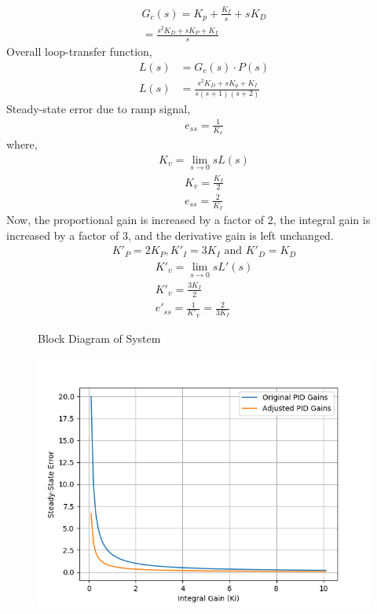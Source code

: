 \documentclass[journal,12pt,twocolumn]{IEEEtran}
\theoremstyle{remark}
\begin{document}
\begin{align}
    G_c(s) = K_p + \frac{K_I}{s} +sK_D\\
    =\frac{s^2K_D + sK_P + K_I}{s}
\end{align}
Overall loop-transfer function,
\begin{align}
    L(s) &= G_c(s)\cdot P(s)\\
    L(s) &= \frac{s^2K_D + sK_p + K_I}{s(s+1)(s+2)}
\end{align}
Steady-state error due to ramp signal,
\begin{align}
    e_{ss} = \frac{1}{K_v}
\end{align}
where,
\begin{align}
    K_v = \lim_{s \to 0} sL(s)
\end{align}
\begin{align}
    K_v = \frac{K_I}{2}\\
    e_{ss} = \frac{2}{K_I}
\end{align}
Now, the proportional gain is increased by a factor of 2, the integral gain is increased by a factor of 3, and the derivative gain is left unchanged.
\begin{align}
    K'_P = 2K_P, K'_I = 3K_I \text{ and } K'_D = K_D
\end{align}
\begin{align}
    K'_v = \lim_{s \to 0} sL'(s)\\
    K'_v = \frac{3K_I}{2}\\
    e'_{ss} = \frac{1}{K'_V} = \frac{2}{3K_I}
\end{align}
\begin{figure}[!ht]
    \resizebox{0.55\textwidth}{!}{}
    \caption{Block Diagram of System}
    \label{fig:gate_IN_Q41_blockdiagram}
\end{figure}

\begin{figure}[htbp]
    \centering
    \includegraphics[width = \columnwidth]{figs/steady_state_error.png}
  \caption{}
    \label{fig:graph1.41.IN.2022}
\end{figure}


% 
\end{document}
